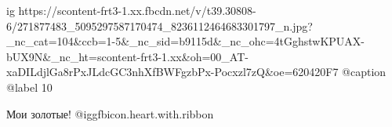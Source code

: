  
 
 
 
 

\ifcmt
  ig https://scontent-frt3-1.xx.fbcdn.net/v/t39.30808-6/271877483_5095297587170474_8236112464683301797_n.jpg?_nc_cat=104&ccb=1-5&_nc_sid=b9115d&_nc_ohc=4tGghstwKPUAX-bUX9N&_nc_ht=scontent-frt3-1.xx&oh=00_AT-xaDILdjlGa8rPxJLdcGC3nhXfBWFgzbPx-Pocxzl7zQ&oe=620420F7
  @caption @label 10
\fi

Мои золотые! @igg{fbicon.heart.with.ribbon} 
